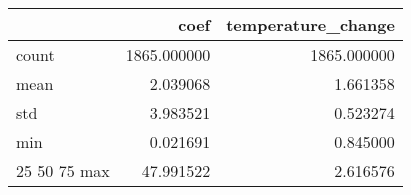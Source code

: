 \begin{tabular}{lrr}
\toprule
 & coef & temperature_change \\
\midrule
count & 1865.000000 & 1865.000000 \\
mean & 2.039068 & 1.661358 \\
std & 3.983521 & 0.523274 \\
min & 0.021691 & 0.845000 \\
25%
50%
75%
max & 47.991522 & 2.616576 \\
\bottomrule
\end{tabular}
